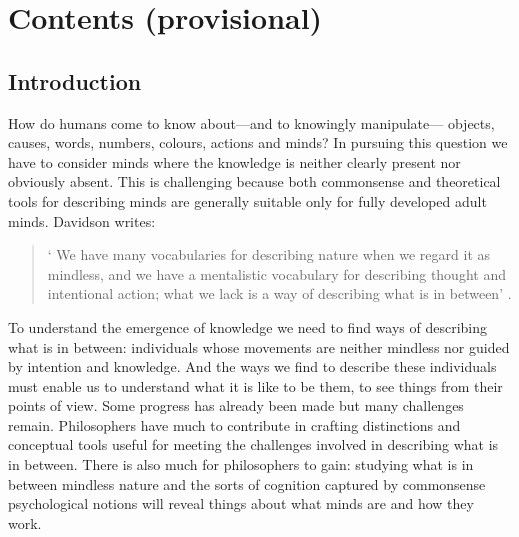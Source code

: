 \documentclass[12pt,\papersize]{extarticle}
\begin{document}
\section{Contents (provisional)}



\subsection{Introduction}
How do humans come to know  about---and to knowingly manipulate---%
objects,
causes,
words,
numbers,
colours,
actions
and
minds?
In pursuing this question we have to consider minds where the knowledge is neither clearly present nor obviously absent. 
This is challenging because both commonsense and theoretical tools for describing minds are generally suitable only for fully developed adult minds. 
Davidson writes:
%
\begin{quote}
`%
We have many vocabularies for describing nature when we regard it as mindless, and we have a mentalistic vocabulary for describing thought and intentional action; what we lack is a way of describing what is in between' \citep[p.\ 11]{Davidson:1999ju}.
\end{quote}
%
%
To understand the emergence of knowledge we need to find ways of describing what is in between: individuals whose movements are neither mindless nor guided by intention and knowledge.  
And the ways we find to describe these individuals 
must enable us to understand what it is like to be them, to
see things from their points of view.
Some progress has already been made but many challenges remain. 
Philosophers have much to contribute in crafting distinctions and conceptual tools useful for meeting the challenges involved in describing what is in between. 
There is also much for philosophers to gain: studying what is in between mindless nature and the sorts of cognition captured by   commonsense psychological notions 
 will reveal things about what minds are and how they work.
\end{document}
